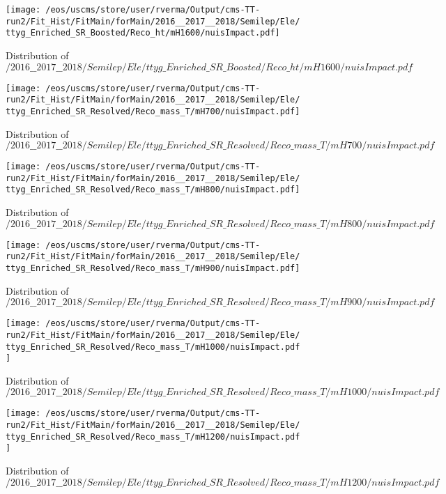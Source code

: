 \begin{figure}
\centering
\texttt{[image: /eos/uscms/store/user/rverma/Output/cms-TT-run2/Fit\_Hist/FitMain/forMain/2016\_\_2017\_\_2018/Semilep/Ele/ttyg\_Enriched\_SR\_Boosted/Reco\_ht/mH1600/nuisImpact.pdf]}
\caption{Distribution of $/2016\_\_2017\_\_2018/Semilep/Ele/ttyg\_Enriched\_SR\_Boosted/Reco\_ht/mH1600/nuisImpact.pdf$}
\end{figure}

\begin{figure}
\centering
\texttt{[image: /eos/uscms/store/user/rverma/Output/cms-TT-run2/Fit\_Hist/FitMain/forMain/2016\_\_2017\_\_2018/Semilep/Ele/ttyg\_Enriched\_SR\_Resolved/Reco\_mass\_T/mH700/nuisImpact.pdf]}
\caption{Distribution of $/2016\_\_2017\_\_2018/Semilep/Ele/ttyg\_Enriched\_SR\_Resolved/Reco\_mass\_T/mH700/nuisImpact.pdf$}
\end{figure}

\begin{figure}
\centering
\texttt{[image: /eos/uscms/store/user/rverma/Output/cms-TT-run2/Fit\_Hist/FitMain/forMain/2016\_\_2017\_\_2018/Semilep/Ele/ttyg\_Enriched\_SR\_Resolved/Reco\_mass\_T/mH800/nuisImpact.pdf]}
\caption{Distribution of $/2016\_\_2017\_\_2018/Semilep/Ele/ttyg\_Enriched\_SR\_Resolved/Reco\_mass\_T/mH800/nuisImpact.pdf$}
\end{figure}

\begin{figure}
\centering
\texttt{[image: /eos/uscms/store/user/rverma/Output/cms-TT-run2/Fit\_Hist/FitMain/forMain/2016\_\_2017\_\_2018/Semilep/Ele/ttyg\_Enriched\_SR\_Resolved/Reco\_mass\_T/mH900/nuisImpact.pdf]}
\caption{Distribution of $/2016\_\_2017\_\_2018/Semilep/Ele/ttyg\_Enriched\_SR\_Resolved/Reco\_mass\_T/mH900/nuisImpact.pdf$}
\end{figure}

\begin{figure}
\centering
\texttt{[image: /eos/uscms/store/user/rverma/Output/cms-TT-run2/Fit\_Hist/FitMain/forMain/2016\_\_2017\_\_2018/Semilep/Ele/ttyg\_Enriched\_SR\_Resolved/Reco\_mass\_T/mH1000/nuisImpact.pdf]}
\caption{Distribution of $/2016\_\_2017\_\_2018/Semilep/Ele/ttyg\_Enriched\_SR\_Resolved/Reco\_mass\_T/mH1000/nuisImpact.pdf$}
\end{figure}

\begin{figure}
\centering
\texttt{[image: /eos/uscms/store/user/rverma/Output/cms-TT-run2/Fit\_Hist/FitMain/forMain/2016\_\_2017\_\_2018/Semilep/Ele/ttyg\_Enriched\_SR\_Resolved/Reco\_mass\_T/mH1200/nuisImpact.pdf]}
\caption{Distribution of $/2016\_\_2017\_\_2018/Semilep/Ele/ttyg\_Enriched\_SR\_Resolved/Reco\_mass\_T/mH1200/nuisImpact.pdf$}
\end{figure}

